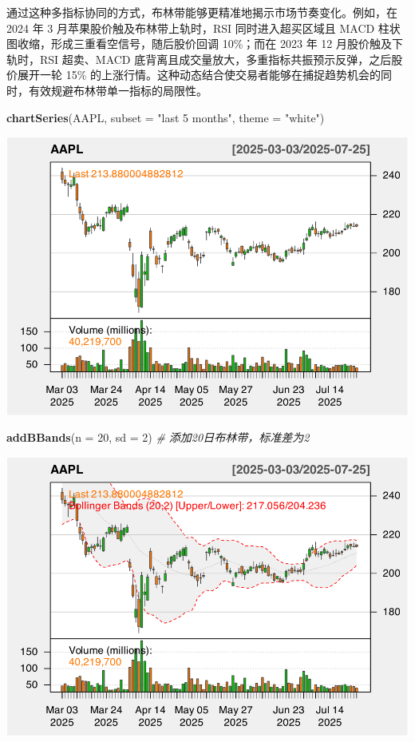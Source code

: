 \documentclass[]{ctexbook}
\newenvironment{Shaded}{\begin{snugshade}}{\end{snugshade}}
\newcommand{\AttributeTok}[1]{\textcolor[rgb]{0.13,0.29,0.53}{#1}}
\newcommand{\CommentTok}[1]{\textcolor[rgb]{0.56,0.35,0.01}{\textit{#1}}}
\newcommand{\DecValTok}[1]{\textcolor[rgb]{0.00,0.00,0.81}{#1}}
\newcommand{\FunctionTok}[1]{\textcolor[rgb]{0.13,0.29,0.53}{\textbf{#1}}}
\newcommand{\NormalTok}[1]{#1}
\newcommand{\StringTok}[1]{\textcolor[rgb]{0.31,0.60,0.02}{#1}}
\begin{document}
通过这种多指标协同的方式，布林带能够更精准地揭示市场节奏变化。例如，在 2024 年 3 月苹果股价触及布林带上轨时，RSI 同时进入超买区域且 MACD 柱状图收缩，形成三重看空信号，随后股价回调 10\%；而在 2023 年 12 月股价触及下轨时，RSI 超卖、MACD 底背离且成交量放大，多重指标共振预示反弹，之后股价展开一轮 15\% 的上涨行情。这种动态结合使交易者能够在捕捉趋势机会的同时，有效规避布林带单一指标的局限性。

\begin{Shaded}
\begin{Highlighting}[]
\FunctionTok{chartSeries}\NormalTok{(AAPL, }\AttributeTok{subset =} \StringTok{"last 5 months"}\NormalTok{, }\AttributeTok{theme =} \StringTok{"white"}\NormalTok{)  }
\end{Highlighting}
\end{Shaded}

\includegraphics[width=0.9\linewidth]{QuantmodHandbook_files/figure-latex/bb_2-1}

\begin{Shaded}
\begin{Highlighting}[]
\FunctionTok{addBBands}\NormalTok{(}\AttributeTok{n =} \DecValTok{20}\NormalTok{, }\AttributeTok{sd =} \DecValTok{2}\NormalTok{)  }\CommentTok{\# 添加20日布林带，标准差为2  }
\end{Highlighting}
\end{Shaded}

\includegraphics[width=0.9\linewidth]{QuantmodHandbook_files/figure-latex/bb_2-2}
\end{document}
